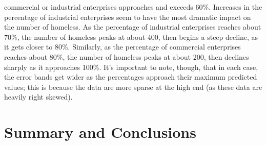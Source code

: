 \documentclass[titlepage]{article}   	%
\begin{document}
commercial or industrial enterprises approaches and exceeds 60\%. Increases in the percentage of industrial enterprises seem to have the most dramatic impact on the number of homeless. As the percentage of industrial enterprises reaches about 70\%, the number of homeless peaks at about 400, then begins a steep decline, as it gets closer to 80\%.  Similarly, as the percentage of commercial enterprises reaches about 80\%, the number of homeless peaks at about 200, then declines sharply as it approaches 100\%. It’s important to note, though, that in each case, the error bands get wider as the percentages approach their maximum predicted values; this is because the data are more sparse at the high end (as these data are heavily right skewed). 



\section{Summary and Conclusions}
\end{document}
